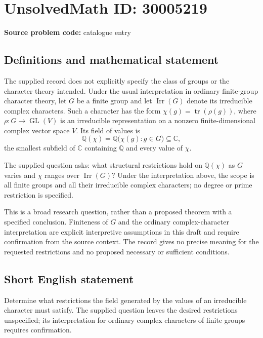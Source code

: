 \documentclass[11pt]{article}
\begin{document}
\section*{UnsolvedMath ID: 30005219}
\textbf{Source problem code:} catalogue entry
\subsection{Definitions and mathematical statement}
The supplied record does not explicitly specify the class of groups or the character theory intended. Under the usual interpretation in ordinary finite-group character theory, let \(G\) be a finite group and let \(\operatorname{Irr}(G)\) denote its irreducible complex characters. Such a character has the form \(\chi(g)=\operatorname{tr}(\rho(g))\), where \(\rho:G\to\operatorname{GL}(V)\) is an irreducible representation on a nonzero finite-dimensional complex vector space \(V\). Its field of values is
\[
\mathbb{Q}(\chi)=\mathbb{Q}\bigl(\chi(g):g\in G\bigr)\subseteq\mathbb{C},
\]
the smallest subfield of \(\mathbb{C}\) containing \(\mathbb{Q}\) and every value of \(\chi\).

The supplied question asks: what structural restrictions hold on \(\mathbb{Q}(\chi)\) as \(G\) varies and \(\chi\) ranges over \(\operatorname{Irr}(G)\)? Under the interpretation above, the scope is all finite groups and all their irreducible complex characters; no degree or prime restriction is specified.

This is a broad research question, rather than a proposed theorem with a specified conclusion. Finiteness of \(G\) and the ordinary complex-character interpretation are explicit interpretive assumptions in this draft and require confirmation from the source context. The record gives no precise meaning for the requested restrictions and no proposed necessary or sufficient conditions.
\subsection{Short English statement}
Determine what restrictions the field generated by the values of an irreducible character must satisfy. The supplied question leaves the desired restrictions unspecified; its interpretation for ordinary complex characters of finite groups requires confirmation.
\end{document}
